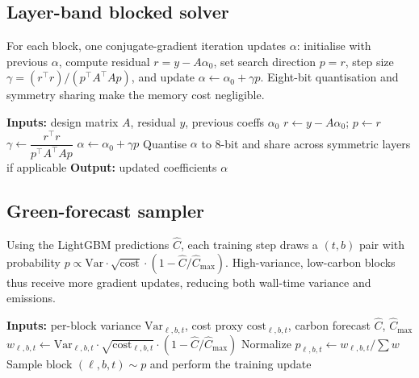 \documentclass{article}
\begin{document}
\subsection{Layer-band blocked solver}
For each block, one conjugate-gradient iteration updates $\alpha$: initialise with previous $\alpha$, compute residual $r = y - A\alpha_0$, set search direction $p = r$, step size $\gamma = (r^\top r)/(p^\top A^\top A p)$, and update $\alpha \leftarrow \alpha_0 + \gamma p$. Eight-bit quantisation and symmetry sharing make the memory cost negligible.

\begin{algorithm}[t]
\caption{Single-iteration conjugate-gradient update per block}
\begin{algorithmic}[1]
\State \textbf{Inputs:} design matrix $A$, residual $y$, previous coeffs $\alpha_0$
\State $r \leftarrow y - A\alpha_0$; $p \leftarrow r$
\State $\gamma \leftarrow \dfrac{r^\top r}{p^\top A^\top A p}$
\State $\alpha \leftarrow \alpha_0 + \gamma p$
\State Quantise $\alpha$ to 8-bit and share across symmetric layers if applicable
\State \textbf{Output:} updated coefficients $\alpha$
\end{algorithmic}
\end{algorithm}

\subsection{Green-forecast sampler}
Using the LightGBM predictions $\hat{C}$, each training step draws a $(t, b)$ pair with probability $p \propto \mathrm{Var}\cdot \sqrt{\mathrm{cost}}\cdot \left(1 - \hat{C}/\hat{C}_{\max}\right)$. High-variance, low-carbon blocks thus receive more gradient updates, reducing both wall-time variance and emissions.

\begin{algorithm}[t]
\caption{Carbon-aware block sampling}
\begin{algorithmic}[1]
\State \textbf{Inputs:} per-block variance $\mathrm{Var}_{\ell,b,t}$, cost proxy $\mathrm{cost}_{\ell,b,t}$, carbon forecast $\hat{C}$, $\hat{C}_{\max}$
  \State $w_{\ell,b,t} \leftarrow \mathrm{Var}_{\ell,b,t}\cdot \sqrt{\mathrm{cost}_{\ell,b,t}}\cdot \left(1 - \hat{C}/\hat{C}_{\max}\right)$
\EndFor
\State Normalize $p_{\ell,b,t} \leftarrow w_{\ell,b,t}/\sum w$
\State Sample block $(\ell,b,t) \sim p$ and perform the training update
\end{algorithmic}
\end{algorithm}
\end{document}
